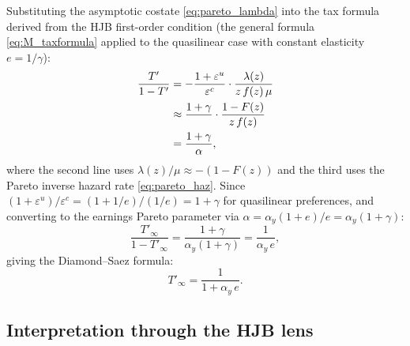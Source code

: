 \documentclass[12pt]{article}
\begin{document}
Substituting the asymptotic costate \eqref{eq:pareto_lambda} into the tax
formula derived from the HJB first-order condition (the general formula
\eqref{eq:M_taxformula} applied to the quasilinear case with constant
elasticity $e = 1/\gamma$):
\begin{align}
  \frac{T'}{1-T'}
  &= -\frac{1+\varepsilon^u}{\varepsilon^c} \cdot
     \frac{\lambda(z)}{z\,f(z)\,\mu} \notag \\
  &\approx \frac{1+\gamma}{\phantom{x}} \cdot
     \frac{1-F(z)}{z\,f(z)} \notag \\
  &= \frac{1+\gamma}{\alpha},
  \label{eq:pareto_wedge}
\end{align}
where the second line uses $\lambda(z)/\mu \approx -(1-F(z))$ and the third
uses the Pareto inverse hazard rate \eqref{eq:pareto_haz}.  Since
$(1+\varepsilon^u)/\varepsilon^c = (1+1/e)/(1/e) = 1+\gamma$ for quasilinear
preferences, and converting to the earnings Pareto
parameter via $\alpha = \alpha_y(1+e)/e = \alpha_y(1+\gamma)$:
\begin{equation}\label{eq:pareto_DS}
  \frac{T'_\infty}{1-T'_\infty}
  = \frac{1+\gamma}{\alpha_y(1+\gamma)}
  = \frac{1}{\alpha_y\, e},
\end{equation}
giving the Diamond--Saez formula:
\begin{equation}\label{eq:DS}
  \boxed{T'_\infty = \frac{1}{1+\alpha_y\, e}.}
\end{equation}

\subsection{Interpretation through the HJB lens}
\end{document}

